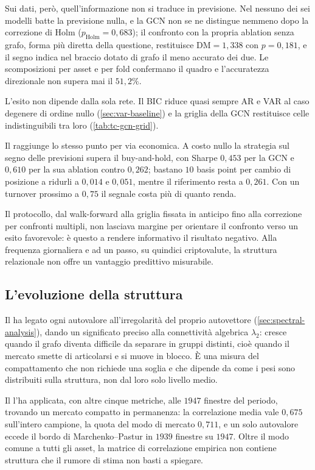 Sui dati, però, quell'informazione non si traduce in previsione. Nel  nessuno dei sei modelli batte la previsione nulla, e la GCN non se ne distingue nemmeno dopo la correzione di Holm ($p_{\mathrm{Holm}}=0{,}683$); il confronto con la propria ablation senza grafo, forma più diretta della questione, restituisce $\mathrm{DM}=1{,}338$ con $p=0{,}181$, e il segno indica nel braccio dotato di grafo il meno accurato dei due. Le scomposizioni per asset e per fold confermano il quadro e l'accuratezza direzionale non supera mai il $51{,}2\%$.

L'esito non dipende dalla sola rete. Il BIC riduce quasi sempre AR e VAR al caso degenere di ordine nullo (\cref{sec:var-baseline}) e la griglia della GCN restituisce celle indistinguibili tra loro (\cref{tab:tc-gcn-grid}).

Il  raggiunge lo stesso punto per via economica. A costo nullo la strategia sul segno delle previsioni supera il buy-and-hold, con Sharpe $0{,}453$ per la GCN e $0{,}610$ per la sua ablation contro $0{,}262$; bastano $10$ basis point per cambio di posizione a ridurli a $0{,}014$ e $0{,}051$, mentre il riferimento resta a $0{,}261$. Con un turnover prossimo a $0{,}75$ il segnale costa più di quanto renda.

Il protocollo, dal walk-forward alla griglia fissata in anticipo fino alla correzione per confronti multipli, non lasciava margine per orientare il confronto verso un esito favorevole: è questo a rendere informativo il risultato negativo. Alla frequenza giornaliera e ad un passo, su quindici criptovalute, la struttura relazionale non offre un vantaggio predittivo misurabile.

\subsection{L'evoluzione della struttura}

Il  ha legato ogni autovalore all'irregolarità del proprio autovettore (\cref{sec:spectral-analysis}), dando un significato preciso alla connettività algebrica $\lambda_2$: cresce quando il grafo diventa difficile da separare in gruppi distinti, cioè quando il mercato smette di articolarsi e si muove in blocco. È una misura del compattamento che non richiede una soglia e che dipende da come i pesi sono distribuiti sulla struttura, non dal loro solo livello medio.

Il  l'ha applicata, con altre cinque metriche, alle $1947$ finestre del periodo, trovando un mercato compatto in permanenza: la correlazione media vale $0{,}675$ sull'intero campione, la quota del modo di mercato $0{,}711$, e un solo autovalore eccede il bordo di Marchenko--Pastur in $1939$ finestre su $1947$. Oltre il modo comune a tutti gli asset, la matrice di correlazione empirica non contiene struttura che il rumore di stima non basti a spiegare.

